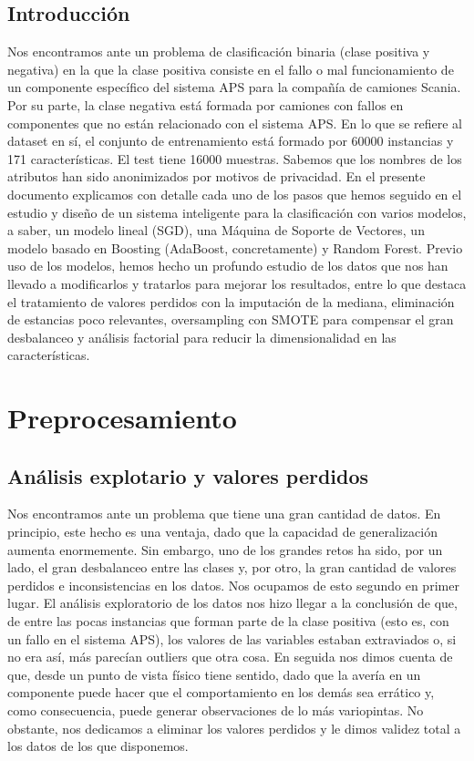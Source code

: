 \subsection{Introducción}

Nos encontramos ante un problema de clasificación binaria (clase positiva y negativa) en la que la clase positiva consiste en el fallo o mal funcionamiento de un componente específico del sistema APS para la compañía de camiones Scania. Por su parte, la clase negativa está formada por camiones con fallos en componentes que no están relacionado con el sistema APS. En lo que se refiere al dataset en sí, el conjunto de entrenamiento está formado por 60000 instancias y 171 características. El test tiene 16000 muestras. Sabemos que los nombres de los atributos han sido anonimizados por motivos de privacidad. En el presente documento explicamos con detalle cada uno de los pasos que hemos seguido en el estudio y diseño de un sistema inteligente para la clasificación con varios modelos, a saber, un modelo lineal (SGD), una Máquina de Soporte de Vectores, un modelo basado en Boosting (AdaBoost, concretamente) y Random Forest. Previo uso de los modelos, hemos hecho un profundo estudio de los datos que nos han llevado a modificarlos y tratarlos para mejorar los resultados, entre lo que destaca el tratamiento de valores perdidos con la imputación de la mediana, eliminación de estancias poco relevantes, oversampling con SMOTE para compensar el gran desbalanceo y análisis factorial para reducir la dimensionalidad en las características. 

\section{Preprocesamiento}

\subsection{Análisis explotario y valores perdidos}

Nos encontramos ante un problema que tiene una gran cantidad de datos. En principio, este hecho es una ventaja, dado que la capacidad de generalización aumenta enormemente. Sin embargo, uno de los grandes retos ha sido, por un lado, el gran desbalanceo entre las clases y, por otro, la gran cantidad de valores perdidos e inconsistencias en los datos. Nos ocupamos de esto segundo en primer lugar. El análisis exploratorio de los datos nos hizo llegar a la conclusión de que, de entre las pocas instancias que forman parte de la clase positiva (esto es, con un fallo en el sistema APS), los valores de las variables estaban extraviados o, si no era así, más parecían outliers que otra cosa. En seguida nos dimos cuenta de que, desde un punto de vista físico tiene sentido, dado que la avería en un componente puede hacer que el comportamiento en los demás sea errático y, como consecuencia, puede generar observaciones de lo más variopintas. No obstante, nos dedicamos a eliminar los valores perdidos y le dimos validez total a los datos de los que disponemos. 


